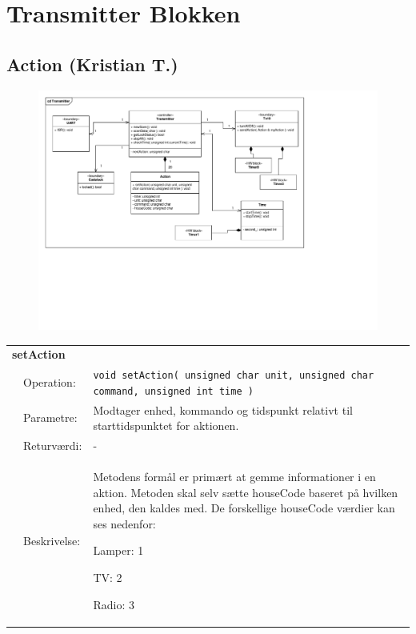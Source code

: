 \section{Transmitter Blokken}

\subsection{Action (Kristian T.)}

\begin{figure}[h]
\centering
\includegraphics[scale=1,clip=true, trim=210 288 442.4 203]{Systemarkitektur/diagrammer/Transmitter_Klassediagram} %
\end{figure}

\begin{table}[h]
\begin{tabularx}{\textwidth}{p{0.6 cm} l X} %
\multicolumn{3}{l}{\textbf{setAction}}\\
& Operation: & %
\texttt{void setAction( unsigned char unit, unsigned char command, unsigned int time ) }
\\ & Parametre: & %
Modtager enhed, kommando og tidspunkt relativt til starttidspunktet for aktionen.
\\ & Returværdi: & %
-
\\ & Beskrivelse: & %
Metodens formål er primært at gemme informationer i en aktion. Metoden skal selv sætte houseCode baseret på hvilken enhed, den kaldes med. De forskellige houseCode værdier kan ses nedenfor:

Lamper: 1

TV: 2

Radio: 3
\\ \end{tabularx}
\end{table}


